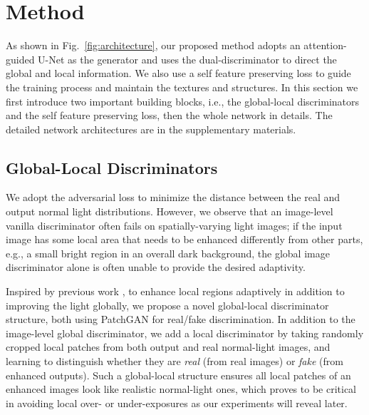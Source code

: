 \documentclass[journal]{IEEEtran}
\begin{document}
\section{Method}
\label{method}
As shown in Fig.~\ref{fig:architecture}, our proposed method adopts an attention-guided U-Net as the generator and uses the dual-discriminator to direct the global and local information. We also use a self feature preserving loss to guide the training process and maintain the textures and structures. In this section we first introduce two important building blocks, i.e., the global-local discriminators and the self feature preserving loss, then the whole network in details. The detailed network architectures are in the supplementary materials.

\subsection{Global-Local Discriminators}
We adopt the adversarial loss to minimize the distance between the real and output normal light distributions. However, we observe that an image-level vanilla discriminator often fails on spatially-varying light images; if the input image has some local area that needs to be enhanced differently from other parts, e.g., a small bright region in an overall dark background, the global image discriminator alone is often unable to provide the desired adaptivity. 

Inspired by previous work \cite{yu2018generative}, to enhance local regions adaptively in addition to improving the light globally, we propose a novel global-local discriminator structure, both using PatchGAN for real/fake discrimination. In addition to the image-level global discriminator, we add a local discriminator by taking randomly cropped local patches from both output and real normal-light images, and learning to distinguish whether they are \textit{real} (from real images) or \textit{fake} (from enhanced outputs). Such a global-local structure ensures all local patches of an enhanced images look like realistic normal-light ones, which proves to be critical in avoiding local over- or under-exposures as our experiments will reveal later.
\end{document}
